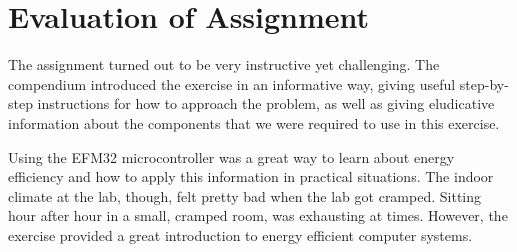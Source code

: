 \section{Evaluation of Assignment}

The assignment turned out to be very instructive yet challenging. The compendium \cite{eeds-compendium} introduced the exercise in an informative way, giving useful step-by-step instructions for how to approach the problem, as well as giving eludicative information about the components that we were required to use in this exercise.

Using the EFM32 microcontroller was a great way to learn about energy efficiency and how to apply this information in practical situations. The indoor climate at the lab, though, felt pretty bad when the lab got cramped. Sitting hour after hour in a small, cramped room, was exhausting at times. However, the exercise provided a great introduction to energy efficient computer systems. 
